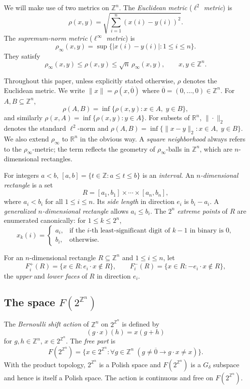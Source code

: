 \documentclass[10pt,a4paper]{amsart}
\begin{document}
We will make use of two metrics on $\mathbb{Z}^n$. The {\em Euclidean metric}
({\em $\ell^2$ metric}) is
\[
\rho(x,y)=\sqrt{\sum_{i=1}^n (x(i)-y(i))^2}.
\]
The {\em supremum-norm metric} ({\em $\ell^\infty$ metric}) is
\[
\rho_\infty(x,y)=\sup\{|x(i)-y(i)|\colon 1\leq i\leq n\}.
\]
They satisfy
\[
\rho_\infty(x,y)\leq \rho(x,y)\leq \sqrt{n}\,\rho_\infty(x,y),\qquad
x,y\in\mathbb{Z}^n.
\]

Throughout this paper, unless explicitly stated otherwise, $\rho$ denotes
the Euclidean metric. We write $\|x\|=\rho(x,\overline{0})$ where
$\overline{0}=(0,\dots,0)\in\mathbb{Z}^n$. For $A, B\subseteq \mathbb{Z}^n$,
\[
\rho(A, B)=\inf\{\rho(x,y)\colon x\in A,\; y\in B\},
\]
and similarly $\rho(x,A)=\inf\{\rho(x,y)\colon y\in A\}$.
For subsets of $\mathbb{R}^n$, $\|\cdot\|_2$ denotes the standard
$\ell^2$-norm and $\rho(A,B)=\inf\{\|x-y\|_2\colon x\in A,\;y\in B\}$.
We also extend $\rho_\infty$ to $\mathbb{R}^n$ in the obvious way.
A {\em square neighborhood} always refers to the $\rho_\infty$-metric; the
term reflects the geometry of $\rho_\infty$-balls in $\mathbb{Z}^n$, which
are $n$-dimensional rectangles.

For integers $a<b$, $[a,b]=\{t\in\mathbb{Z}\colon a\leq t\leq b\}$ is an
{\em interval}. An {\em $n$-dimensional rectangle} is a set
\[
R=[a_1,b_1]\times \cdots\times[a_n, b_n],
\]
where $a_i<b_i$ for all $1\leq i\leq n$. Its {\em side length} in direction
$e_i$ is $b_i-a_i$. A {\em generalized $n$-dimensional rectangle} allows
$a_i\leq b_i$. The $2^n$ {\em extreme points} of $R$ are enumerated
canonically: for $1\leq k\leq 2^n$,
\[
x_k(i)=\begin{cases}
a_i, & \text{if the $i$-th least-significant digit of $k-1$ in
binary is $0$},\\
b_i, & \text{otherwise}.
\end{cases}
\]

For an $n$-dimensional rectangle $R\subseteq\mathbb{Z}^n$ and
$1\leq i\leq n$, let
\[
F_i^+(R)=\{x\in R\colon e_i\cdot x\notin R\},\qquad
F_i^-(R)=\{x\in R\colon -e_i\cdot x\notin R\},
\]
the {\em upper} and {\em lower faces} of $R$ in direction $e_i$.

\subsection{The space $F(2^{\mathbb{Z}^n})$}

The {\em Bernoulli shift action} of $\mathbb{Z}^n$ on $2^{\mathbb{Z}^n}$ is defined by 
$$(g\cdot x)(h)=x(g+h)$$ for $g,h\in\mathbb{Z}^n$, $x\in 2^{\mathbb{Z}^n}$.
The {\em free part} is
\[
F(2^{\mathbb{Z}^n})=\{x\in 2^{\mathbb{Z}^n}\colon
\forall g\in\mathbb{Z}^n\;(g\neq \overline{0}\rightarrow g\cdot x\neq x)\}.
\]
With the product topology, $2^{\mathbb{Z}^n}$ is a Polish space and
$F(2^{\mathbb{Z}^n})$ is a $G_\delta$ subspace and hence is itself a Polish space. The action is continuous
and free on $F(2^{\mathbb{Z}^n})$.
\end{document}
